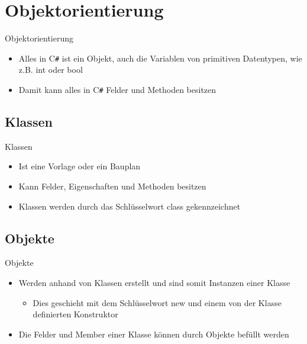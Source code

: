 \section{Objektorientierung}
\begin{frame}{Objektorientierung}
	\begin{itemize}
		\item Alles in C\texttt{\#} ist ein Objekt, auch die Variablen von primitiven Datentypen, wie z.B. \alert{int} oder \alert{bool}
		\item Damit kann alles in C\texttt{\#} Felder und Methoden besitzen		
	\end{itemize}
\end{frame}

\subsection{Klassen}
\begin{frame}{Klassen}
	\begin{itemize}
		\item Ist eine Vorlage oder ein Bauplan
		\item Kann Felder, Eigenschaften und Methoden besitzen
		\item Klassen werden durch das Schlüsselwort \alert{class} gekennzeichnet
	\end{itemize}	
	
\end{frame}

\subsection{Objekte}
\begin{frame}{Objekte}
	\begin{itemize}
		\item Werden anhand von Klassen erstellt und sind somit Instanzen einer Klasse
		\begin{itemize}
			\item Dies geschieht mit dem Schlüsselwort \alert{new} und einem von der Klasse definierten Konstruktor
		\end{itemize}
		\item Die Felder und Member einer Klasse können durch Objekte befüllt werden
	\end{itemize}
		
\end{frame}

